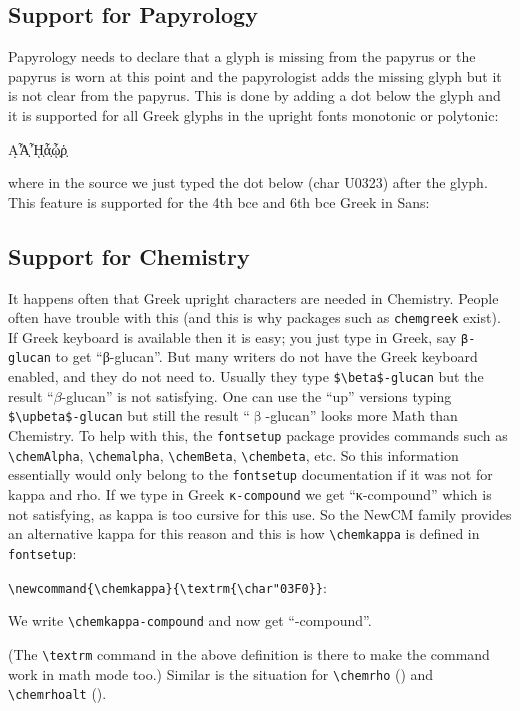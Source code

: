 \documentclass{article}
\begin{document}
\subsection{Support for Papyrology}
Papyrology needs to declare that a glyph is missing from the papyrus or
the papyrus is worn at this point and the papyrologist adds the missing glyph
but it is not clear from the papyrus. This is done by adding a dot below the glyph
and it is supported for all Greek glyphs in the upright fonts monotonic or polytonic:
\begin{center}
{\Large Α̣\quad Ἆ̣\quad ᾞ̣\quad ἇ̣\quad ᾦ̣\quad ῥ̣}
\end{center}
where in the source we just typed the dot below (char U0323) after the glyph.
This feature is supported for the 4th bce and 6th bce Greek in Sans:
\begin{center}
  \quad\quad{}
\end{center}


\subsection{Support for Chemistry}
It happens often that Greek upright characters are needed in Chemistry. People often
have trouble with this (and this is why packages such as \texttt{chemgreek} exist).
If Greek keyboard is available then it is easy; you just type in Greek, say
\texttt{β-glucan} to get ``β-glucan''.
But many writers do not have the Greek keyboard enabled, and they do not need to.
Usually they type \verb|$\beta$-glucan| but the result ``$\beta$-glucan'' is not satisfying.
One can use the ``up'' versions typing \verb|$\upbeta$-glucan| but still the result
``$\upbeta$-glucan'' looks more Math than Chemistry.
To help with this, the \texttt{fontsetup} package provides commands such as \verb|\chemAlpha|,
\verb|\chemalpha|, \verb|\chemBeta|, \verb|\chembeta|, etc. So this information essentially would
only belong to the \verb|fontsetup| documentation if it was not for kappa and rho. If we type
in Greek \texttt{κ-compound} we get ``κ-compound'' which is not satisfying, as kappa is too
cursive for this use. So the NewCM family provides an alternative kappa for this reason
and this is how \verb|\chemkappa| is defined in \verb|fontsetup|:

\verb|\newcommand{\chemkappa}{\textrm{\char"03F0}}|:
\begin{center}
  We write \verb|\chemkappa-compound| and now get ``\chemkappa-compound''.
\end{center}
(The \verb|\textrm| command in the above definition is there to make the command work
in math mode too.)
Similar is the situation for \verb|\chemrho| (\chemrho) and \verb|\chemrhoalt| (\chemrhoalt).
\end{document}
